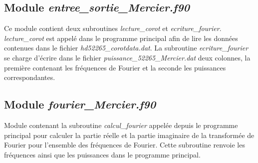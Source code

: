 \documentclass[a4paper,11pt]{article}
\numberwithin{equation}{section}
\begin{document}
\subsection{Module \textit{entree\_sortie\_Mercier.f90}}
Ce module contient deux subroutines \textit{lecture\_corot} et \textit{ecriture\_fourier}. \textit{lecture\_corot} est appelé dans le programme principal afin de lire les
données contenues dans le fichier \textit{hd52265\_corotdata.dat}.\newline
La subroutine \textit{ecriture\_fourier} se charge d'écrire dans le fichier \textit{puissance\_52265\_Mercier.dat} deux colonnes, la première contenant les fréquences de Fourier
et la seconde les puissances correspondantes.

\subsection{Module \textit{fourier\_Mercier.f90}}
Module contenant la subroutine \textit{calcul\_fourier} appelée depuis le programme principal pour calculer la partie réelle et la partie imaginaire de la transformée de Fourier pour l'ensemble des fréquences de Fourier. Cette subroutine renvoie les fréquences ainsi que les puissances dans le programme principal.



\end{document}
